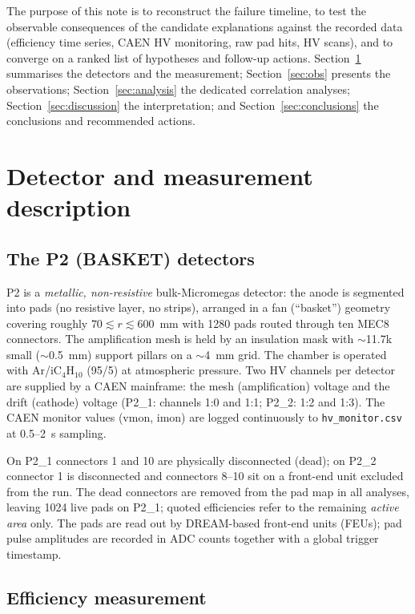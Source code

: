 \documentclass[11pt,a4paper]{article}
\newcommand{\detone}{P2\_1}
\newcommand{\dettwo}{P2\_2}
\begin{document}
The purpose of this note is to reconstruct the failure timeline, to test the
observable consequences of the candidate explanations against the recorded
data (efficiency time series, CAEN HV monitoring, raw pad hits, HV scans),
and to converge on a ranked list of hypotheses and follow-up actions.
Section~\ref{sec:setup} summarises the detectors and the measurement;
Section~\ref{sec:obs} presents the observations; Section~\ref{sec:analysis}
the dedicated correlation analyses; Section~\ref{sec:discussion} the
interpretation; and Section~\ref{sec:conclusions} the conclusions and
recommended actions.

\section{Detector and measurement description}
\label{sec:setup}

\subsection{The P2 (BASKET) detectors}

P2 is a \emph{metallic, non-resistive} bulk-Micromegas detector: the anode is
segmented into pads (no resistive layer, no strips), arranged in a fan
(``basket'') geometry covering roughly $70\lesssim r \lesssim 600$~mm with
1280 pads routed through ten MEC8 connectors. The amplification mesh is held
by an insulation mask with $\sim$11.7k small ($\sim$0.5~mm) support pillars
on a $\sim$4~mm grid. The chamber is operated with Ar/iC$_4$H$_{10}$ (95/5)
at atmospheric pressure. Two HV channels per detector are supplied by a CAEN
mainframe: the mesh (amplification) voltage and the drift (cathode) voltage
(\detone: channels 1:0 and 1:1; \dettwo: 1:2 and 1:3). The CAEN monitor
values (vmon, imon) are logged continuously to \texttt{hv\_monitor.csv} at
0.5--2~s sampling.

On \detone{} connectors 1 and 10 are physically disconnected (dead); on
\dettwo{} connector 1 is disconnected and connectors 8--10 sit on a front-end
unit excluded from the run. The dead connectors are removed from the pad map
in all analyses, leaving 1024 live pads on \detone{}; quoted efficiencies
refer to the remaining \emph{active area} only. The pads are read out by
DREAM-based front-end units (FEUs); pad pulse amplitudes are recorded in ADC
counts together with a global trigger timestamp.

\subsection{Efficiency measurement}
\end{document}
